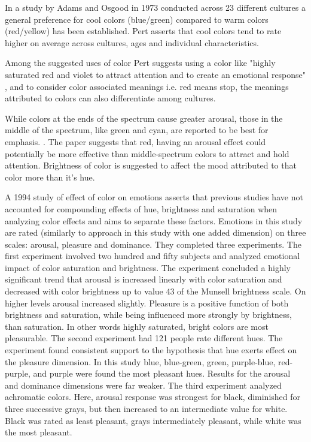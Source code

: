 		In a study by Adams and Osgood in 1973 conducted across 23 different cultures a general preference for cool colors (blue/green) compared to warm colors (red/yellow) has been established. Pert asserts that cool colors tend to rate higher on average across cultures, ages and individual characteristics.
		
		Among the suggested uses of color Pert suggests using a color like "highly saturated red and violet to attract attention and to create an emotional response" \cite{Pert1996}, and to consider color associated meanings i.e. red means stop, the meanings attributed to colors can also differentiate among cultures.
		
		
		While colors at the ends of the spectrum cause greater arousal, those in the middle of the spectrum, like green and cyan, are reported to be best for emphasis. \cite{Pert1996}. The paper suggests that red, having an arousal effect could potentially be more effective than middle-spectrum colors to attract and hold attention. Brightness of color is suggested to affect the mood attributed to that color more than it's hue.

		A 1994 study \cite{Valdez1994} of effect of color on emotions asserts that previous studies have not accounted for compounding effects of hue, brightness and saturation when analyzing color effects and aims to separate these factors. Emotions in this study are rated (similarly to approach in this study with one added dimension) on three scales: arousal, pleasure and dominance. They completed three experiments.
		The first experiment involved two hundred and fifty subjects and analyzed emotional impact of color saturation and brightness. The experiment concluded a highly significant trend that arousal is increased linearly with color saturation and decreased with color brightness up to value 43 of the Munsell brightness scale. On higher levels arousal increased slightly. Pleasure is a positive function of both brightness and saturation, while being influenced more strongly by brightness, than saturation. In other words highly saturated, bright colors are most pleasurable.
		The second experiment had 121 people rate different hues. The experiment found consistent support to the hypothesis that hue exerts effect on the pleasure dimension. In this study blue, blue-green, green, purple-blue, red-purple, and purple	were found the most pleasant hues. Results for the arousal and dominance dimensions were far weaker.
		The third experiment analyzed achromatic colors. Here, arousal response was strongest for black, diminished for three successive grays, but then increased to an intermediate value for white. Black was rated as least pleasant, grays intermediately pleasant, while white was the most pleasant. \cite{Valdez1994} 
		
